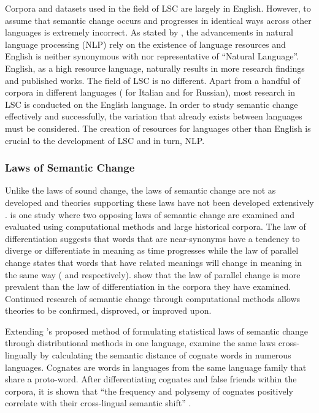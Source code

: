 Corpora and datasets used in the field of LSC are largely in English. However, to assume that semantic change occurs and progresses in identical ways across other languages is extremely incorrect. As stated by \citet{bender_2020}, the advancements in natural language processing (NLP) rely on the existence of language resources and English is neither synonymous with nor representative of “Natural Language”. English, as a high resource language, naturally results in more research findings and published works. The field of LSC is no different. Apart from a handful of corpora in different languages (\citet{diacrita_evalita2020} for Italian and \citet{rushifteval2021} for Russian), most research in LSC is conducted on the English language. In order to study semantic change effectively and successfully, the variation that already exists between languages must be considered. The creation of resources for languages other than English is crucial to the development of LSC and in turn, NLP.   


\subsubsection{Laws of Semantic Change}

Unlike the laws of sound change, the laws of semantic change are not as developed and theories supporting these laws have not been developed extensively \citep{Xu2015ACE}. \citet{Xu2015ACE} is one study where two opposing laws of semantic change are examined and evaluated using computational methods and large historical corpora. The law of differentiation suggests that words that are near-synonyms have a tendency to diverge or differentiate in meaning as time progresses while the law of parallel change states that words that have related meanings will change in meaning in the same way (\citet{breal1897essai} and \citet{stern-1921} respectively). \citet{Xu2015ACE} show that the law of parallel change is more prevalent than the law of differentiation in the corpora they have examined. Continued research of semantic change through computational methods allows theories to be confirmed, disproved, or improved upon. 

Extending \citet{hamilton-etal-2016-diachronic}’s proposed method of formulating statistical laws of semantic change through distributional methods in one language, \citet{uban-etal-2019-studying} examine the same laws cross-lingually by calculating the semantic distance of cognate words in numerous languages. Cognates are words in languages from the same language family that share a proto-word. After differentiating cognates and false friends within the corpora, it is shown that “the frequency and polysemy of cognates positively correlate with their cross-lingual semantic shift” \citep{uban-etal-2019-studying}.

